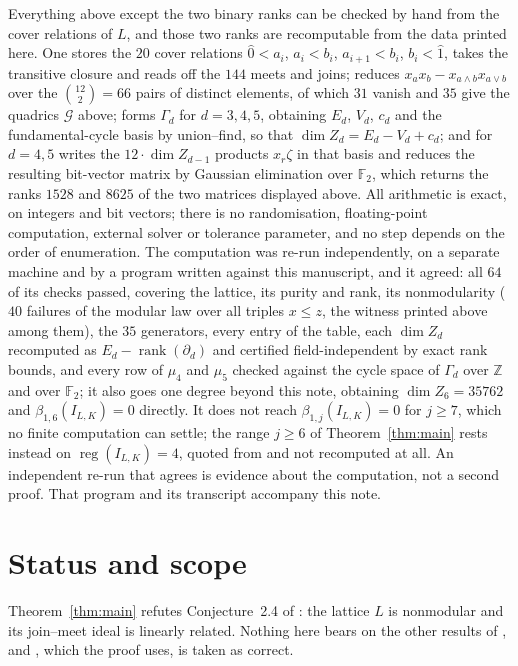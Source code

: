 \documentclass[11pt]{amsart}
\begin{document}
Everything above except the two binary ranks can be checked by hand from
the cover relations of $L$, and those two ranks are recomputable from the
data printed here. One stores the $20$ cover relations $\widehat0<a_i$,
$a_i<b_i$, $a_{i+1}<b_i$, $b_i<\widehat1$, takes the transitive closure
and reads off the $144$ meets and joins; reduces
$x_ax_b-x_{a\wedge b}x_{a\vee b}$ over the $\binom{12}{2}=66$ pairs of
distinct elements, of which $31$ vanish and $35$ give the quadrics
$\mathcal G$ above; forms $\Gamma_d$ for $d=3,4,5$, obtaining $E_d$,
$V_d$, $c_d$ and the fundamental-cycle basis by union--find, so that
$\dim Z_d=E_d-V_d+c_d$; and for $d=4,5$ writes the $12\cdot\dim Z_{d-1}$
products $x_r\zeta$ in that basis and reduces the resulting bit-vector
matrix by Gaussian elimination over $\mathbb F_2$, which returns the
ranks $1528$ and $8625$ of the two matrices displayed above. All
arithmetic is exact, on integers and bit vectors; there is no
randomisation, floating-point computation, external solver or tolerance
parameter, and no step depends on the order of enumeration. The
computation was re-run independently, on a separate machine and by a
program written against this manuscript,
and it agreed: all $64$ of its checks passed, covering the lattice, its
purity and rank, its nonmodularity ($40$ failures of the modular law over
all triples $x\le z$, the witness printed above among them), the $35$
generators, every entry of the table, each $\dim Z_d$ recomputed as
$E_d-\operatorname{rank}(\partial_d)$ and certified field-independent by
exact rank bounds, and every row of $\mu_4$ and $\mu_5$ checked against
the cycle space of $\Gamma_d$ over $\mathbb Z$ and over $\mathbb F_2$; it
also goes one degree beyond this note, obtaining $\dim Z_6=35762$ and
$\beta_{1,6}(I_{L,K})=0$ directly. It does not reach
$\beta_{1,j}(I_{L,K})=0$ for $j\ge7$, which no finite computation can
settle; the range $j\ge6$ of Theorem~\ref{thm:main} rests instead on
$\operatorname{reg}(I_{L,K})=4$, quoted from \cite[Lemma~2.8]{HSF} and
not recomputed at all. An independent re-run that agrees is evidence
about the computation, not a second proof. That program and its
transcript accompany this note.

\section{Status and scope}

Theorem~\ref{thm:main} refutes Conjecture~2.4 of \cite{HSF}: the lattice
$L$ is nonmodular and its join--meet ideal is linearly related. Nothing
here bears on the other results of \cite{HSF}, and
\cite[Lemma~2.8]{HSF}, which the proof uses, is taken as correct.
\end{document}
